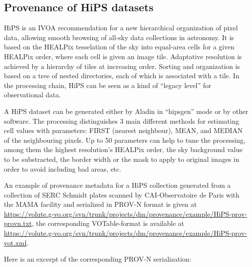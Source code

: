 \subsection{Provenance of HiPS datasets}
HiPS \citep{std:HiPs} is an IVOA recommendation for a new hierarchical
organization of pixel data, allowing smooth browsing of all-sky data collections
in astronomy. It is based on the HEALPix tesselation of the sky into equal-area
cells for a given HEALPix order, where each cell is given an image tile.
Adaptative resolution is achieved by a hierarchy of tiles at increasing
order. Sorting and organization is based on a tree of nested directories, each
of which is associated with a tile. In the processing chain, HiPS can be seen
as a kind of ``legacy level'' for observational data.


A HiPS dataset can be generated either by Aladin in ``hipsgen'' mode or by other
software.
The processing distinguishes 3 main different methods for estimating cell values
with parameters: FIRST (nearest neighbour), MEAN, and MEDIAN of the neighbouring
pixels. Up to 50 parameters can help to tune the processing, among them the
highest resolution's HEALPix order, the sky background value to be substracted,
the border width or the mask to apply to original images in order to avoid
including bad areas, etc.


An example of provenance metadata for a HiPS collection generated from a
collection of SERC Schmidt plates scanned by CAI-Observatoire de Paris with the
MAMA facility and serialized in PROV-N format is given at \\
\url{https://volute.g-vo.org/svn/trunk/projects/dm/provenance/example/HiPS-prov-provn.txt}, the corresponding VOTable-format is available at \\
\url{https://volute.g-vo.org/svn/trunk/projects/dm/provenance/example/HiPS-prov-vot.xml}.

Here is an excerpt of the corresponding PROV-N serialization:

